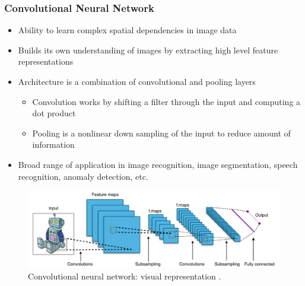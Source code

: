 \documentclass[10pt, presentation]{beamer}
\begin{document}
    \begin{frame}
        \frametitle{Convolutional Neural Network}
        \begin{itemize}
            \item Ability to learn complex spatial dependencies in image data \cite{Goodfellow-et-al-2016}
            \item Builds its own understanding of images by extracting high level feature representations
            \item Architecture is a combination of convolutional and pooling layers
            \begin{itemize}
                \item Convolution works by shifting a filter through the input and computing a dot product
                \item Pooling is a nonlinear down sampling of the input to reduce amount of information
            \end{itemize}
            \item Broad range of application in image recognition, image segmentation, speech recognition, anomaly detection, etc.
        \end{itemize}
        \begin{figure}
            \centerline{\includegraphics[width=\linewidth,height=0.3\textheight,keepaspectratio]{figures/cnn2.png}}
            \caption{Convolutional neural network: visual representation \cite{WEBSITE:1}.}
        \end{figure}
    \end{frame}
\end{document}
